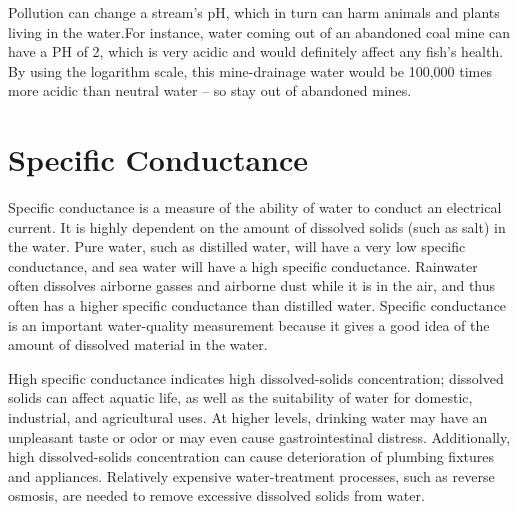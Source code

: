 \documentclass[a4paper]{article}
\begin{document}
\begin{minipage}[t]{0.45\textwidth}
{\normalsize Pollution can change a stream's pH, which in turn can harm animals and plants living in the water.For instance, water coming out of an abandoned coal mine can have a PH of 2, which is very acidic and would definitely affect any fish's health. By using the logarithm scale, this mine-drainage water would be 100,000 times more acidic than neutral water -- so stay out of abandoned mines.}
\section*{\small Specific Conductance}
{\normalsize Specific conductance is a measure of the ability of water to conduct an electrical current. It is highly dependent on the amount of dissolved solids (such as salt) in the water. Pure water, such as distilled water, will have a very low specific conductance, and sea water will have a high specific conductance. Rainwater often dissolves airborne gasses and airborne dust while it is in the air, and thus often has a higher specific conductance than distilled water. Specific conductance is an important water-quality measurement because it gives a good idea of the amount of dissolved material in the water.\\ \par
High specific conductance indicates high dissolved-solids concentration; dissolved solids can affect aquatic life, as well as the suitability of water for domestic, industrial, and agricultural uses. At higher levels, drinking water may have an unpleasant taste or odor or may even cause gastrointestinal distress. Additionally, high dissolved-solids concentration can cause deterioration of plumbing fixtures and appliances. Relatively expensive water-treatment processes, such as reverse osmosis, are needed to remove excessive dissolved solids from water.}

\end{minipage}
\end{document}
